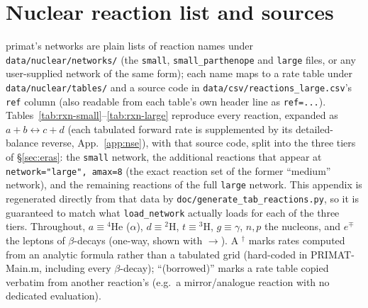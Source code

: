 \documentclass[11pt,a4paper]{article}
\newcommand{\code}[1]{\texttt{#1}}
\begin{document}
\section{Nuclear reaction list and sources}\label{app:reactions}
primat's networks are plain lists of reaction names under
\code{data/nuclear/networks/} (the \code{small}, \code{small\_parthenope} and
\code{large} files, or any user-supplied network of the same form); each name
maps to a rate table under \code{data/nuclear/tables/} and a source code in
\code{data/csv/reactions\_large.csv}'s \code{ref} column (also readable from
each table's own header line as \code{ref=...}).
Tables~\ref{tab:rxn-small}--\ref{tab:rxn-large} reproduce every reaction,
expanded as $a+b\leftrightarrow c+d$ (each tabulated forward rate is supplemented
by its detailed-balance reverse, App.~\ref{app:nse}), with that source code,
split into the three tiers of \S\ref{sec:eras}: the \code{small} network, the
additional reactions that appear at \code{network="large", amax=8} (the exact
reaction set of the former ``medium'' network), and the remaining reactions
of the full \code{large} network. This appendix is regenerated directly from
that data by \code{doc/generate\_tab\_reactions.py}, so it is guaranteed to
match what \code{load\_network} actually loads for each of the three tiers.
Throughout, $a\equiv{}^4$He ($\alpha$), $d\equiv{}^2$H, $t\equiv{}^3$H,
$g\equiv\gamma$, $n,p$ the nucleons, and $e^\mp$ the leptons of $\beta$-decays
(one-way, shown with $\to$). A $^\dagger$ marks rates computed from an
analytic formula rather than a tabulated grid (hard-coded in PRIMAT-Main.m,
including every $\beta$-decay); ``(borrowed)'' marks a rate table copied
verbatim from another reaction's (e.g.\ a mirror/analogue reaction with no
dedicated evaluation).
\end{document}
